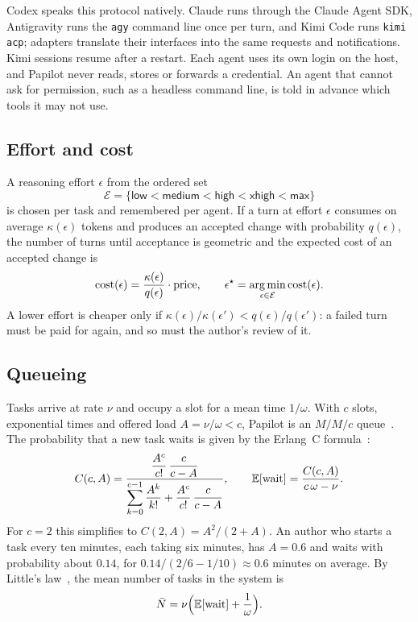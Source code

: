 Codex speaks this protocol natively. Claude runs through the Claude Agent SDK,
Antigravity runs the \texttt{agy} command line once per turn, and Kimi Code
runs \texttt{kimi acp}; adapters translate their interfaces into the same
requests and notifications. Kimi sessions resume after a restart. Each
agent uses its own login on the host, and Papilot never reads, stores or
forwards a credential. An agent that cannot ask for permission, such as a
headless command line, is told in advance which tools it may not use.

\subsection{Effort and cost}

A reasoning effort $\epsilon$ from the ordered set
\begin{equation}
  \mathcal{E} = \{\textsf{low} < \textsf{medium} < \textsf{high} <
  \textsf{xhigh} < \textsf{max}\}
\end{equation}
is chosen per task and remembered per agent. If a turn at effort $\epsilon$
consumes on average $\kappa(\epsilon)$ tokens and produces an accepted change
with probability $q(\epsilon)$, the number of turns until acceptance is
geometric and the expected cost of an accepted change is
\begin{equation}
  \operatorname{cost}(\epsilon) = \frac{\kappa(\epsilon)}{q(\epsilon)}
  \cdot \operatorname{price}, \qquad
  \epsilon^{\star} = \operatorname*{arg\,min}_{\epsilon \in \mathcal{E}}
    \operatorname{cost}(\epsilon).
  \label{eq:effort-cost}
\end{equation}
A lower effort is cheaper only if
$\kappa(\epsilon) / \kappa(\epsilon') < q(\epsilon) / q(\epsilon')$: a failed
turn must be paid for again, and so must the author's review of it.

\subsection{Queueing}

Tasks arrive at rate $\nu$ and occupy a slot for a mean time $1/\omega$. With
$c$ slots, exponential times and offered load $A = \nu/\omega < c$, Papilot is
an $M/M/c$ queue~\cite{kleinrock1975}. The probability that a new task waits is
given by the Erlang~C formula~\cite{erlang1917}:
\begin{equation}
  C(c, A) =
  \frac{\dfrac{A^{c}}{c!}\,\dfrac{c}{c - A}}
       {\displaystyle\sum_{k=0}^{c-1} \frac{A^{k}}{k!}
        + \frac{A^{c}}{c!}\,\frac{c}{c - A}},
  \qquad
  \mathbb{E}[\text{wait}] = \frac{C(c, A)}{c\,\omega - \nu} .
  \label{eq:erlang}
\end{equation}
For $c = 2$ this simplifies to $C(2, A) = A^2 / (2 + A)$. An author who starts
a task every ten minutes, each taking six minutes, has $A = 0.6$ and waits
with probability about $0.14$, for $0.14 / (2/6 - 1/10) \approx 0.6$ minutes on
average. By Little's law~\cite{little1961}, the mean number of tasks in the
system is
\begin{equation}
  \bar{N} = \nu \Bigl( \mathbb{E}[\text{wait}] + \frac{1}{\omega} \Bigr) .
  \label{eq:little}
\end{equation}

